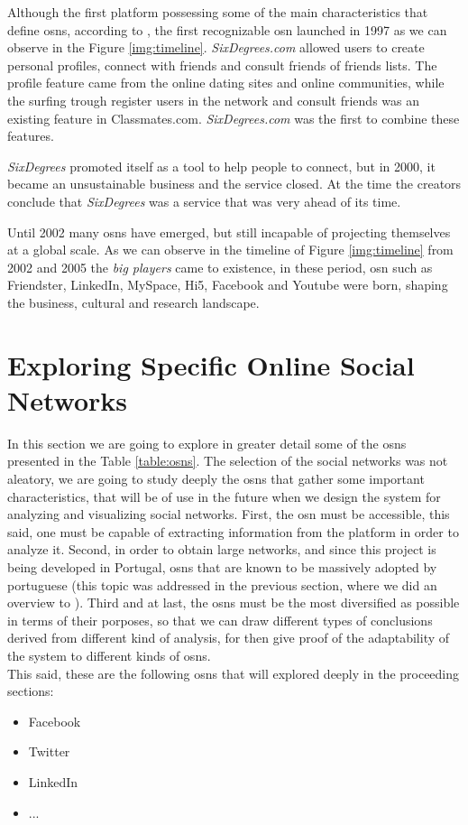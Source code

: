 Although the first platform possessing some of the main characteristics that define \glspl{osn},
according to \cite{ellison2007social}, the first recognizable \gls{osn} launched in 1997 as we can observe in the Figure \ref{img:timeline}. \textit{SixDegrees.com} allowed users to create personal
profiles, connect with friends and consult friends of friends lists. The profile feature came from the
online dating sites and online communities, while the surfing trough register users in the network
and consult friends was an existing feature in Classmates.com. \textit{SixDegrees.com} was the first to combine
these features.

\textit{SixDegrees} promoted itself as a tool to help people to connect, but in 2000, it became an
unsustainable business and the service closed. At the time the creators conclude that
\textit{SixDegrees} was a service that was very ahead of its time.

Until 2002 many \glspl{osn} have emerged, but still incapable of projecting themselves at a global scale.
As we can observe in the timeline of Figure \ref{img:timeline} from 2002 and 2005 the \textit{big players} came to existence, in these period, \gls{osn}
such as Friendster, LinkedIn, MySpace, Hi5, Facebook and Youtube were born, shaping the business, cultural
and research landscape.


\section{Exploring Specific Online Social Networks}

In this section we are going to explore in greater detail some of the \glspl{osn} presented
in the Table \ref{table:osns}. The selection of the social networks was not aleatory, we are going
to study deeply the \glspl{osn} that gather some important characteristics, that will be of use in
the future when we design the system for analyzing and visualizing social networks. First, the
\gls{osn} must be accessible, this said, one must be capable of extracting information from the platform
in order to analyze it. Second, in order to obtain large networks, and since this project is being
developed in Portugal, \glspl{osn} that are known to be massively adopted by portuguese (this topic was
addressed in the previous section, where we did an overview to \cite{marktest2016}). Third and at last,
the \glspl{osn} must be the most diversified as possible in terms of their porposes, so that we
can draw different types of conclusions derived from different kind of analysis, for then give proof
of the adaptability of the system to different kinds of \glspl{osn}.\\
\indent This said, these are the following \glspl{osn} that will explored deeply in the proceeding sections:
\begin{itemize}
  \item Facebook
  \item Twitter
  \item LinkedIn
  \item ...
\end{itemize}

